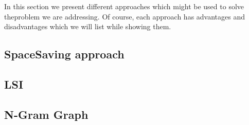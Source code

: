 In this section we present different approaches which might be used to solve theproblem we are addressing. Of course, each approach has advantages and disadvantages which we will list while showing them.


\subsection*{SpaceSaving approach}


\subsection*{LSI}


\subsection*{N-Gram Graph}


